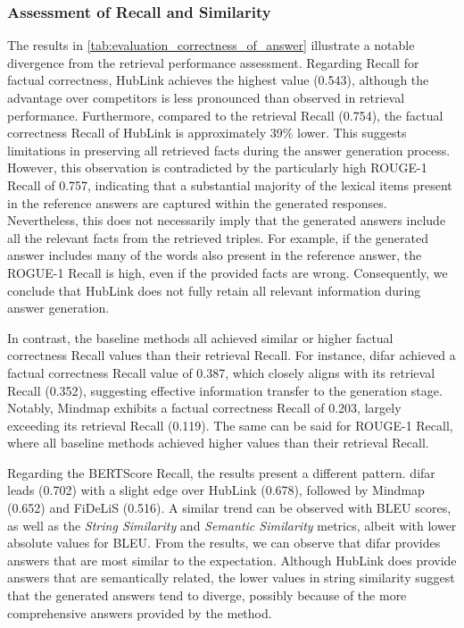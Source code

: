\subsubsection{Assessment of Recall and Similarity}

The results in \autoref{tab:evaluation_correctness_of_answer} illustrate a notable divergence from the retrieval performance assessment. Regarding Recall for factual correctness, HubLink achieves the highest value (0.543), although the advantage over competitors is less pronounced than observed in retrieval performance. Furthermore, compared to the retrieval Recall (0.754), the factual correctness Recall of HubLink is approximately 39\% lower. This suggests limitations in preserving all retrieved facts during the answer generation process. However, this observation is contradicted by the particularly high ROUGE-1 Recall of 0.757, indicating that a substantial majority of the lexical items present in the reference answers are captured within the generated responses. Nevertheless, this does not necessarily imply that the generated answers include all the relevant facts from the retrieved triples. For example, if the generated answer includes many of the words also present in the reference answer, the ROGUE-1 Recall is high, even if the provided facts are wrong. Consequently, we conclude that HubLink does not fully retain all relevant information during answer generation.

In contrast, the baseline methods all achieved similar or higher factual correctness Recall values than their retrieval Recall. For instance, \gls{difar} achieved a factual correctness Recall value of 0.387, which closely aligns with its retrieval Recall (0.352), suggesting effective information transfer to the generation stage. Notably, Mindmap exhibits a factual correctness Recall of 0.203, largely exceeding its retrieval Recall (0.119). The same can be said for ROUGE-1 Recall, where all baseline methods achieved higher values than their retrieval Recall. 

Regarding the BERTScore Recall, the results present a different pattern. \gls{difar} leads (0.702) with a slight edge over HubLink (0.678), followed by Mindmap (0.652) and FiDeLiS (0.516). A similar trend can be observed with BLEU scores, as well as the \emph{String Similarity} and \emph{Semantic Similarity} metrics, albeit with lower absolute values for BLEU. From the results, we can observe that \gls{difar} provides answers that are most similar to the expectation. Although HubLink does provide answers that are semantically related, the lower values in string similarity suggest that the generated answers tend to diverge, possibly because of the more comprehensive answers provided by the method.

